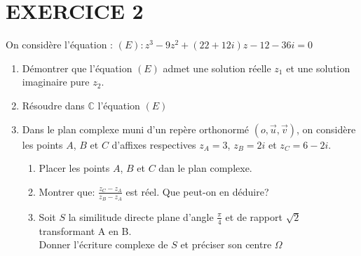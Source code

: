 \documentclass[12pts]{book}
\begin{document}
	\section*{EXERCICE 2}
		On considère l'équation : $(E): z^3-9z^2+(22+12i)z-12-36i=0$
		\begin{enumerate}
			\item Démontrer que l'équation $(E)$ admet une solution réelle $z_1$ et une solution imaginaire pure $z_2$.
			\item Résoudre dans $\mathbb{C}$ l'équation $(E)$
			\item Dans le plan complexe muni d'un repère orthonormé $(o,\overrightarrow{u},\overrightarrow{v})$, on considère les points $A$, $B$ et $C$ d'affixes respectives $z_A=3$, $z_B=2i$ et $z_C=6-2i$.
			\begin{enumerate}
				\item Placer les points $A$, $B$ et $C$ dan le plan complexe.
				\item Montrer que: $\frac{z_C-z_A}{z_B-z_A}$ est réel. Que peut-on en déduire?
				\item Soit $S$ la similitude directe plane d'angle $\frac{\pi}{4}$ et de rapport $\sqrt{2}$ transformant A en B.\\
				Donner l'écriture complexe de $S$ et préciser son centre $\Omega$
			\end{enumerate}
		\end{enumerate}
	
\end{document}
